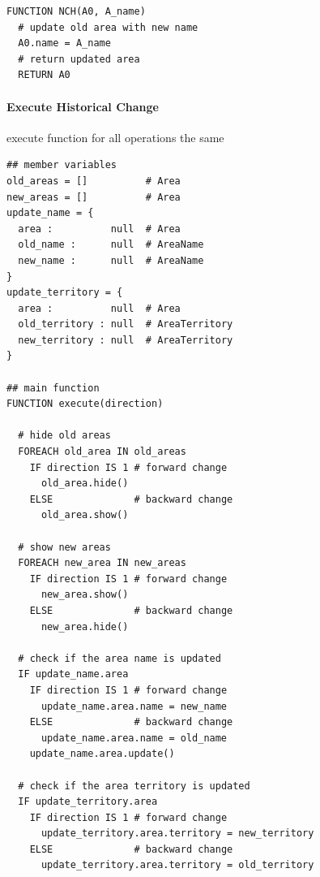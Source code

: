 \vspace{-1.5em}
\begin{minipage}[t]{0.47\textwidth}
\begin{lstlisting}[language=pseudocode,
  caption=Name Change]
FUNCTION NCH(A0, A_name)
  # update old area with new name
  A0.name = A_name
  # return updated area
  RETURN A0

\end{lstlisting}
\end{minipage}



\paragraph{Execute Historical Change} %
\label{par:execute_historical_change}

execute function for all operations the same

\begin{lstlisting}[language=pseudocode,
  caption=class HGOperation]
## member variables
old_areas = []          # Area
new_areas = []          # Area
update_name = {
  area :          null  # Area
  old_name :      null  # AreaName
  new_name :      null  # AreaName
}
update_territory = {
  area :          null  # Area
  old_territory : null  # AreaTerritory
  new_territory : null  # AreaTerritory
}

## main function
FUNCTION execute(direction)

  # hide old areas
  FOREACH old_area IN old_areas
    IF direction IS 1 # forward change
      old_area.hide()
    ELSE              # backward change
      old_area.show()

  # show new areas
  FOREACH new_area IN new_areas
    IF direction IS 1 # forward change
      new_area.show()
    ELSE              # backward change
      new_area.hide()

  # check if the area name is updated
  IF update_name.area
    IF direction IS 1 # forward change
      update_name.area.name = new_name
    ELSE              # backward change
      update_name.area.name = old_name
    update_name.area.update()

  # check if the area territory is updated
  IF update_territory.area
    IF direction IS 1 # forward change
      update_territory.area.territory = new_territory
    ELSE              # backward change
      update_territory.area.territory = old_territory

\end{lstlisting}

